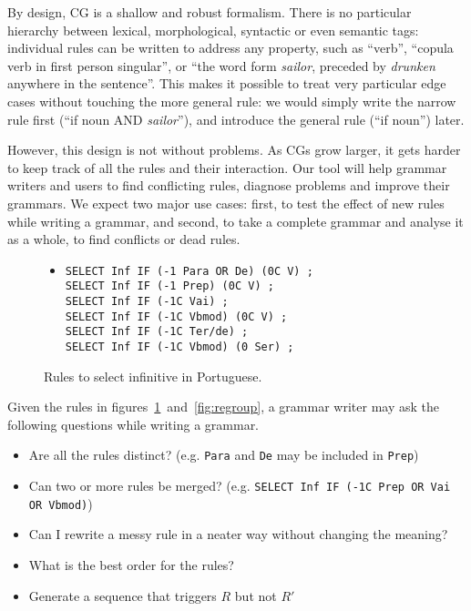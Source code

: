 By design, CG is a shallow and robust formalism. 
There is no particular hierarchy between lexical, morphological,
syntactic or even semantic tags: individual rules can be written to address any
property, such as ``verb'', ``copula verb in first person singular'',
or ``the word form \emph{sailor}, preceded by \emph{drunken} anywhere in the
sentence''. This makes it possible to treat very particular edge
cases without touching the more general rule: we would simply write
the narrow rule first (``if noun AND \emph{sailor}''), and introduce
the general rule (``if noun'') later.


However, this design is not without problems. As CGs grow larger, it
gets harder to keep track of all the rules and their interaction.
Our tool will help grammar writers and users to find conflicting
rules, diagnose problems and improve their grammars. 
We expect two major use cases: 
first, to test the effect of new rules while writing a grammar, and
second, to take a complete grammar and analyse it as a whole, to find
conflicts or dead rules.



\begin{figure}[t]
\centering

\begin{itemize}
\item[]
\begin{verbatim}SELECT Inf IF (-1 Para OR De) (0C V) ;
SELECT Inf IF (-1 Prep) (0C V) ;
SELECT Inf IF (-1C Vai) ;
SELECT Inf IF (-1C Vbmod) (0C V) ;
SELECT Inf IF (-1C Ter/de) ;
SELECT Inf IF (-1C Vbmod) (0 Ser) ;
\end{verbatim}
\end{itemize}

\caption{Rules to select infinitive in Portuguese.}

\label{fig:infrules}
\end{figure}






Given the rules in figures~\ref{fig:infrules}~and~\ref{fig:regroup}, a
grammar writer may ask the following questions while writing a grammar. 

\begin{itemize}
\item Are all the rules distinct? (e.g. \texttt{Para} and \texttt{De} may be included in \texttt{Prep})
\item Can two or more rules be merged? (e.g. \texttt{SELECT Inf IF
    (-1C Prep OR Vai OR Vbmod)})
\item Can I rewrite a messy rule in a neater way without changing the meaning?
\item What is the best order for the rules?
\item Generate a sequence that triggers $R$ but not $R'$ 
\end{itemize}

